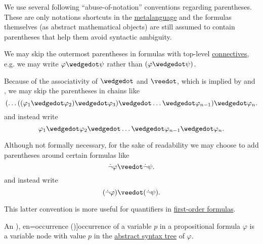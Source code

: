 \begin{remark}\label{rem:propositional_formula_parentheses}
  We use several following \enquote{abuse-of-notation} conventions regarding parentheses. These are only notations shortcuts in the \hyperref[con:metalogic]{metalanguage} and the formulas themselves (as abstract mathematical objects) are still assumed to contain parentheses that help them avoid syntactic ambiguity.

  \begin{thmenum}
     We may skip the outermost parentheses in formulas with top-level \hyperref[def:propositional_alphabet/connectives]{connectives}, e.g. we may write \( \varphi \synwedge \psi \) rather than \( (\varphi \synwedge \psi) \).

     Because of the associativity of \( \synwedge \) and \( \synvee \), which is implied by  and , we may skip the parentheses in chains like
    \begin{equation*}
      ( \ldots ((\varphi_1 \synwedge \varphi_2) \synwedge \varphi_3) \synwedge \ldots \synwedge \varphi_{n-1} ) \synwedge \varphi_n.
    \end{equation*}
    and instead write
    \begin{equation*}
      \varphi_1 \synwedge \varphi_2 \synwedge \ldots \synwedge \varphi_{n-1} \synwedge \varphi_n.
    \end{equation*}

     Although not formally necessary, for the sake of readability we may choose to add parentheses around certain formulas like
    \begin{equation*}
      \synneg \varphi \synvee \synneg \psi.
    \end{equation*}
    and instead write
    \begin{equation*}
      (\synneg \varphi) \synvee (\synneg \psi).
    \end{equation*}

    This latter convention is more useful for quantifiers in \hyperref[def:first_order_syntax/formula]{first-order formulas}.
  \end{thmenum}
\end{remark}

\begin{definition}\label{def:propositional_variable_occurrence}\mimprovised
  An \term[ru=вхождение (\cite[64]{Герасимов2011}), en=occurrence (\cite[9A2]{Hindley1997})]{occurrence} of a variable \( p \) in a propositional formula \( \varphi \) is a variable node with value \( p \) in the \hyperref[def:propositional_formula_ast]{abstract syntax tree} of \( \varphi \).
\end{definition}

